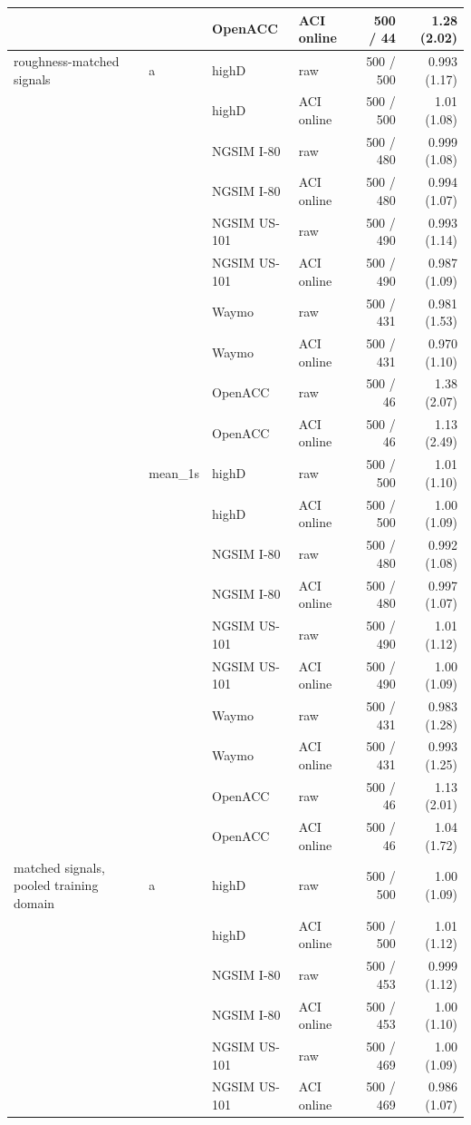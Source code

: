 \begin{longtable}{llllrr}
 &  & OpenACC & ACI online & 500 / 44 & 1.28 (2.02) \\
\midrule
roughness-matched signals & a & highD & raw & 500 / 500 & 0.993 (1.17) \\
 &  & highD & ACI online & 500 / 500 & 1.01 (1.08) \\
 &  & NGSIM I-80 & raw & 500 / 480 & 0.999 (1.08) \\
 &  & NGSIM I-80 & ACI online & 500 / 480 & 0.994 (1.07) \\
 &  & NGSIM US-101 & raw & 500 / 490 & 0.993 (1.14) \\
 &  & NGSIM US-101 & ACI online & 500 / 490 & 0.987 (1.09) \\
 &  & Waymo & raw & 500 / 431 & 0.981 (1.53) \\
 &  & Waymo & ACI online & 500 / 431 & 0.970 (1.10) \\
 &  & OpenACC & raw & 500 / 46 & 1.38 (2.07) \\
 &  & OpenACC & ACI online & 500 / 46 & 1.13 (2.49) \\
\midrule
 & mean\_1s & highD & raw & 500 / 500 & 1.01 (1.10) \\
 &  & highD & ACI online & 500 / 500 & 1.00 (1.09) \\
 &  & NGSIM I-80 & raw & 500 / 480 & 0.992 (1.08) \\
 &  & NGSIM I-80 & ACI online & 500 / 480 & 0.997 (1.07) \\
 &  & NGSIM US-101 & raw & 500 / 490 & 1.01 (1.12) \\
 &  & NGSIM US-101 & ACI online & 500 / 490 & 1.00 (1.09) \\
 &  & Waymo & raw & 500 / 431 & 0.983 (1.28) \\
 &  & Waymo & ACI online & 500 / 431 & 0.993 (1.25) \\
 &  & OpenACC & raw & 500 / 46 & 1.13 (2.01) \\
 &  & OpenACC & ACI online & 500 / 46 & 1.04 (1.72) \\
\midrule
matched signals, pooled training domain & a & highD & raw & 500 / 500 & 1.00 (1.09) \\
 &  & highD & ACI online & 500 / 500 & 1.01 (1.12) \\
 &  & NGSIM I-80 & raw & 500 / 453 & 0.999 (1.12) \\
 &  & NGSIM I-80 & ACI online & 500 / 453 & 1.00 (1.10) \\
 &  & NGSIM US-101 & raw & 500 / 469 & 1.00 (1.09) \\
 &  & NGSIM US-101 & ACI online & 500 / 469 & 0.986 (1.07) \\

\end{longtable}
